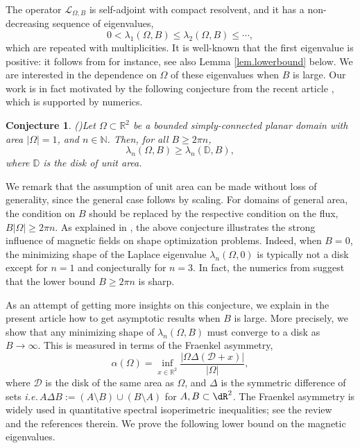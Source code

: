 \documentclass[11pt,a4paper]{amsart}
\newcommand\Omg{\Omega}
\newcommand\sm{\setminus}
\newcommand{\ie}{{\it i.e.}\,}
\numberwithin{figure}{section}
\numberwithin{equation}{section}
\theoremstyle{plain}%
\theoremstyle{remark}
\theoremstyle{plain}
\newcommand\cD{\mathcal D}
\newcommand\cF{\mathcal F}
\def\cD{{\mathcal D}}   \def\cE{{\mathcal E}}   \def\cF{{\mathcal F}}
\newtheorem{conjecture}{Conjecture}
\newcommand{\R}{\mathbb R}
\newcommand{\D}{\mathbb D}
\begin{document}
The operator $\mathscr{L}_{\Omega,B}$ is self-adjoint with  compact resolvent, and it has a non-decreasing sequence of eigenvalues,
\[ 0<\lambda_1(\Omega,B) \leq \lambda_2(\Omega,B) \leq \cdots, 
\]
which are repeated with multiplicities. It is well-known that the first eigenvalue is positive: it follows from \cite[Theorem 3.1]{HelfferSundqvist} for instance, see also Lemma \ref{lem.lowerbound} below. We are interested in the dependence on $\Omega$ of these eigenvalues when $B$ is large. Our work is in fact motivated by the following conjecture from the recent article \cite{baur}, which is supported by numerics.

\begin{conjecture}{\rm (}\cite[Conjecture 4.2]{baur}{\rm )}\label{conjecture}
Let $\Omega \subset \R^2$ be a bounded simply-connected planar domain with area $|\Omega|=1$, and $n \in \mathbb N$. Then, for all $B\ge 2\pi n$,
\begin{equation}\label{eq.conjecture}
\lambda_n(\Omega,B) \geq \lambda_n(\D,B),
\end{equation}
where $\D$ is the disk of unit area.
\end{conjecture}
We remark that the assumption of unit area can be made without loss of generality, since the general case follows by scaling.
For domains of general area, the condition on $B$ should be replaced by the respective condition on the flux, $B |\Omega| \geq 2\pi n$. As explained in \cite{baur}, the above conjecture illustrates the strong influence of magnetic fields on shape optimization problems. Indeed, when $B=0$, the minimizing shape of the Laplace eigenvalue $\lambda_n(\Omega,0)$ is typically not a disk except for $n=1$ and conjecturally for $n=3$. In fact, the numerics from \cite{baur} suggest that the lower bound $B \geq 2\pi n$ is sharp. 

As an attempt of getting more insights on this conjecture, we explain in the present article how to get asymptotic results when $B$ is large. More precisely, we show that any minimizing shape of $\lambda_n(\Omega,B)$ must converge to a disk as $B \to \infty$. This is measured in terms of the Fraenkel asymmetry,
\begin{equation}\label{def.asymmetry}
\alpha(\Omega) = \inf_{x \in \R^2} \frac{|\Omega \Delta (\cD + x)|}{|\Omg|},
\end{equation}
where $\cD$ is the disk of the same area as $\Omg$, and $\Delta$ is the symmetric difference of sets \ie $A\Delta B := (A\sm B)\cup (B\sm A)$ for $A,B\subset\dR^2$.
 The Fraenkel asymmetry is widely used in quantitative spectral isoperimetric inequalities; see the review~\cite{BP17} and the references therein. We prove the following lower bound on the magnetic eigenvalues.
\end{document}
